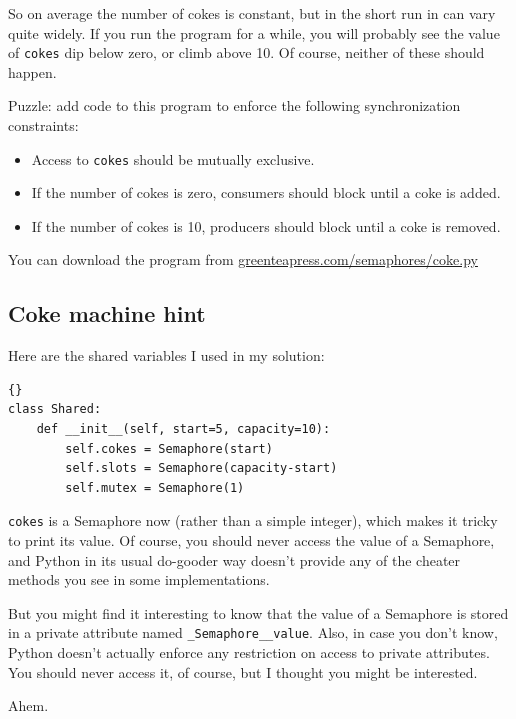 \documentclass{book}
\newcommand{\clearemptydoublepage}{\newpage\cleardoublepage}
\begin{document}
So on average the number of cokes is constant, but in the short
run in can vary quite widely.  If you run the program for a
while, you will probably see the value of {\tt cokes} dip
below zero, or climb above 10.  Of course, neither of these
should happen.

Puzzle: add code to this program to enforce the following
synchronization constraints:

\begin{itemize}

\item Access to {\tt cokes} should be mutually exclusive.

\item If the number of cokes is zero, consumers should block
until a coke is added.

\item If the number of cokes is 10, producers should block
until a coke is removed.

\end{itemize}

You can download the program from
\url{greenteapress.com/semaphores/coke.py}


\clearemptydoublepage
\subsection {Coke machine hint}

Here are the shared variables I used in my solution:

\begin{lstlisting}[title={}]{}
class Shared:
    def __init__(self, start=5, capacity=10):
        self.cokes = Semaphore(start)
        self.slots = Semaphore(capacity-start)
        self.mutex = Semaphore(1)
\end{lstlisting}

{\tt cokes} is a Semaphore now (rather than a simple integer), 
which makes it tricky to print its value.  Of course, you
should never access the value of a Semaphore, and Python in
its usual do-gooder way doesn't provide any of the cheater
methods you see in some implementations.

But you might find it interesting to know that the value
of a Semaphore is stored in a private attribute named
{\tt \_Semaphore\_\_value}.  Also, in case you don't know,
Python doesn't actually enforce any restriction on access to
private attributes.  You should never access it, of course,
but I thought you might be interested.

Ahem.
\end{document}
